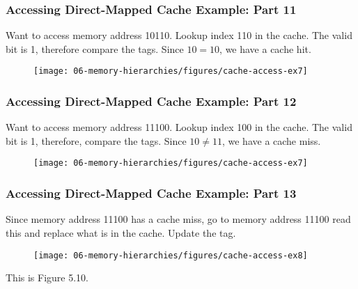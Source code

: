 {\begin{frame}
\end{frame}
\newpage
\begin{frame}\frametitle{Accessing Direct-Mapped Cache Example: Part 11}
Want to access memory address 10110. Lookup index 110 in the cache. The valid bit is 1, therefore compare the tags. Since $10=10$, we have a cache hit.
\begin{figure}[H]
\centering
{\texttt{[image: 06-memory-hierarchies/figures/cache-access-ex7]}}
\end{figure}

\end{frame}
\begin{frame}\frametitle{Accessing Direct-Mapped Cache Example: Part 12}
Want to access memory address 11100. Lookup index 100 in the cache. The valid bit is 1, therefore, compare the tags. Since $10\neq 11$, we have a cache miss.
\begin{figure}[H]
\centering
{\texttt{[image: 06-memory-hierarchies/figures/cache-access-ex7]}}
\end{figure}
\end{frame}
\newpage
\begin{frame}\frametitle{Accessing Direct-Mapped Cache Example: Part 13}
Since memory address 11100 has a cache miss, go to memory address 11100 read this and replace what is in the cache. Update the tag.

\begin{figure}[H]
\centering
{\texttt{[image: 06-memory-hierarchies/figures/cache-access-ex8]}}
\end{figure}
\end{frame}
}\fi



\begin{frame}[fragile]
\BNotes\ifnum{}
This is Figure 5.10.
\fi\ENotes
\end{frame}


